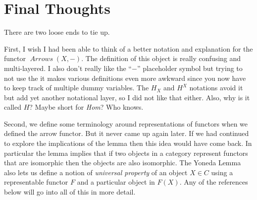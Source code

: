 \documentclass[12pt]{article}
\theoremstyle{definition}
\theoremstyle{definition}
\theoremstyle{definition}
\numberwithin{equation}{section}
\newcommand{\h}{H}                      %
\DeclareMathOperator{\Arrows}{\mathit{Arrows}}
\begin{document}
\section{Final Thoughts}

There are two loose ends to tie up.

First, I wish I had been able to think of a better notation and explanation for the functor 
$\Arrows(X, -)$. The definition of this object is really confusing and multi-layered. 
I also don't really like the ``$-$'' placeholder symbol but trying to not use the
it makes various definitions
even more awkward since you now have to keep track of multiple dummy variables. 
The $\h_X$ and $\h^X$ notations avoid it but add yet another 
notational layer, so I did not like that either. Also, why is it called $H$? 
Maybe short for {\it Hom}? Who knows. 

Second, we define some terminology around representations of functors when we defined the arrow functor. But 
it never came up again later. If we had continued to explore the implications of the lemma then this idea would
have come back. In particular the lemma implies that if two objects 
in a category represent functors that are isomorphic
then the objects are also isomorphic. The Yoneda Lemma also lets us define a notion of {\it universal property} 
of an object $X \in C$ using a representable functor $F$ and a particular object in $F(X)$.
Any of the references below will go into all of this in more detail.
\end{document}
